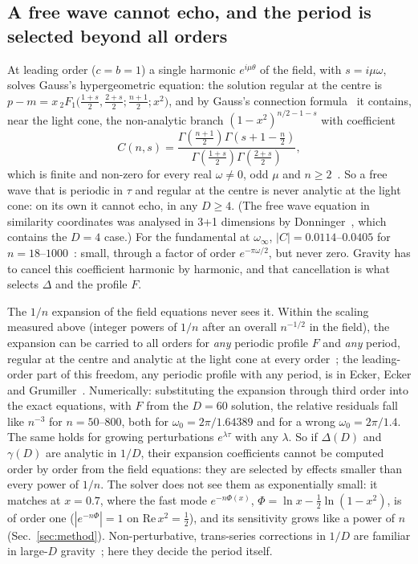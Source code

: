 \documentclass[aps,prd,onecolumn,superscriptaddress,nofootinbib,10pt]{revtex4-2}
\begin{document}
\subsection{A free wave cannot echo, and the period is selected beyond all orders}
\label{sec:allorders}

At leading order ($c = b = 1$) a single harmonic $e^{i\mu\theta}$ of the field, with $s = i\mu\omega$, solves
Gauss's hypergeometric equation: the solution regular at the centre is $p - m = x\,{}_2F_1\big(\tfrac{1+s}{2},
\tfrac{2+s}{2}; \tfrac{n+1}{2}; x^2\big)$, and by Gauss's connection formula~\cite{DLMF} it contains, near the
light cone, the non-analytic branch $(1-x^2)^{n/2-1-s}$ with coefficient
\begin{equation}
C(n,s) = \frac{\Gamma\!\left(\frac{n+1}{2}\right)\Gamma\!\left(s+1-\frac n2\right)}{\Gamma\!\left(\frac{1+s}{2}\right)\Gamma\!\left(\frac{2+s}{2}\right)} ,
\label{eq:C}
\end{equation}
which is finite and non-zero for every real $\omega \ne 0$, odd $\mu$ and $n \ge 2$~\cite[Prop.~2]{math}. So a free wave
that is periodic in $\tau$ and regular at the centre is never analytic at the light cone: on its own it cannot echo, in
any $D \ge 4$. (The free wave equation in similarity coordinates was analysed in 3+1 dimensions by
Donninger~\cite{Donninger2009}, which contains the $D = 4$ case.) For the fundamental at $\omega_\infty$,
$|C| = 0.0114$--$0.0405$ for $n = 18$--$1000$~\cite{math}: small, through a factor of order $e^{-\pi\omega/2}$, but never
zero. Gravity has to cancel this coefficient harmonic by harmonic, and that cancellation is what selects $\Delta$ and the
profile $F$.

The $1/n$ expansion of the field equations never sees it. Within the scaling measured above (integer powers of $1/n$
after an overall $n^{-1/2}$ in the field), the expansion can be carried to all orders for \emph{any} periodic profile $F$
and \emph{any} period, regular at the centre and analytic at the light cone at every order~\cite[Prop.~1]{math}; the
leading-order
part of this freedom, any periodic profile with any period, is in Ecker, Ecker and
Grumiller~\cite{EckerEckerGrumiller2026}. Numerically: substituting the expansion through third order into the exact
equations, with $F$ from the $D = 60$ solution, the relative residuals fall like $n^{-3}$ for $n = 50$--$800$, both for
$\omega_0 = 2\pi/1.64389$ and for a wrong $\omega_0 = 2\pi/1.4$. The same holds for growing perturbations
$e^{\lambda\tau}$ with any $\lambda$. So if $\Delta(D)$ and $\gamma(D)$ are analytic in $1/D$, their expansion coefficients
cannot be computed order by order from the field equations: they are selected by effects smaller than every power of
$1/n$. The solver does not see them as exponentially small: it matches at $x = 0.7$, where the fast mode
$e^{-n\Phi(x)}$, $\Phi = \ln x - \tfrac12\ln(1-x^2)$, is of order one ($|e^{-n\Phi}| = 1$ on $\mathrm{Re}\,x^2 = \tfrac12$),
and its sensitivity grows like a power of $n$ (Sec.~\ref{sec:method}).
Non-perturbative, trans-series corrections in $1/D$ are familiar in large-$D$ gravity~\cite{EmparanHerzog2020}; here they
decide the period itself.
\end{document}
